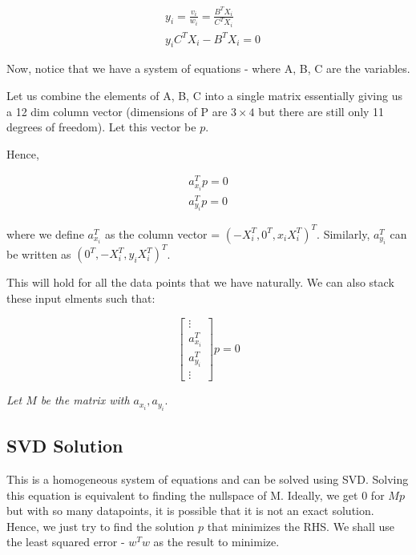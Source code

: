 \begin{equation}
\begin{split}
    &y_i = \frac{v_i}{w_i} = \frac{B^TX_i}{C^TX_i} \\
    &y_iC^TX_i - B^TX_i = 0
\end{split}\end{equation}

Now, notice that we have a system of equations - where A, B, C are the variables. 

Let us combine the elements of A, B, C into a single matrix essentially giving us a 12 dim column vector (dimensions of P are $3\times4$ but there are still only 11 degrees of freedom). Let this vector be $p$.

Hence,

\begin{equation}
\begin{split}
    a_{x_i}^Tp=0 \\
    a_{y_i}^Tp=0
\end{split}
\end{equation}

where we define $a_{x_i}^T$ as the column vector = $(-X_i^T, 0^T, x_iX_i^T)^T$. Similarly, $a_{y_i}^T$ can be written as $(0^T, -X_i^T, y_iX_i^T)^T$. 

This will hold for all the data points that we have naturally. We can also stack these input elments such that:

\begin{equation}
    \begin{bmatrix}
    \vdots \\
    a_{x_i}^T \\
    a_{y_i}^T \\
    \vdots
    \end{bmatrix} p = 0
\end{equation}

\textit{Let $M$ be the matrix with $a_{x_i}, a_{y_i}$}.

\subsection{SVD Solution}

This is a homogeneous system of equations and can be solved using SVD. Solving this equation is equivalent to finding the nullspace of M. Ideally, we get 0 for $Mp$ but with so many datapoints, it is possible that it is not an exact solution. Hence, we just try to find the solution $p$ that minimizes the RHS. We shall use the least squared error - $w^Tw$ as the result to minimize.

